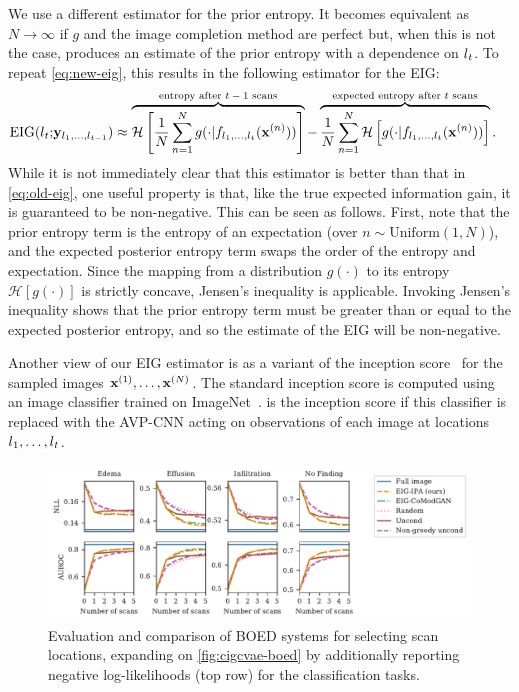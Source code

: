 We use a different estimator for the prior entropy. It becomes equivalent as $N
\rightarrow \infty$ if $g$ and the image completion method are perfect but, when
this is not the case, produces an estimate of the prior entropy with a
dependence on $l{}_t$. To repeat \cref{eq:new-eig}, this results in the following
estimator for the EIG:
\begin{align}
  \label{eq:new-eig-supp}
  \text{EIG}(l{}_t;& {\mathbf{y}}_{l{}_1,\ldots,l{}_{t-1}}) \approx \overbrace{\mathcal{H} \left[ \frac{1}{N} \sum_{n=1}^N g(\cdot|f_{l{}_1,\ldots,l{}_t}({\mathbf{x}}^{(n)})) \right]}^{\text{entropy after $t-1$ scans}} - \overbrace{\frac{1}{N} \sum_{n=1}^N  \mathcal{H} \left[ g(\cdot|f_{l{}_1,\ldots,l{}_t}({\mathbf{x}}^{(n)})) \right]}^{\text{expected entropy after $t$ scans}}.
\end{align}
While it is not immediately clear that this estimator is better than that in
\cref{eq:old-eig}, one useful property is that, like the true expected
information gain, it is guaranteed to be non-negative. This can be seen as
follows. First, note that the prior entropy term is the entropy of an
expectation (over $n \sim \text{Uniform}(1, N)$), and the expected posterior
entropy term swaps the order of the entropy and expectation. Since the mapping
from a distribution $g(\cdot)$ to its entropy $\mathcal{H}[g(\cdot)]$ is
strictly concave, Jensen's inequality is applicable. Invoking Jensen's
inequality shows that the prior entropy term must be greater than or equal to
the expected posterior entropy, and so the estimate of the EIG will be
non-negative. 

Another view of our EIG estimator is as a variant of the inception
score~\citep{salimans2016improved} for the sampled images
${\mathbf{x}}^{(1)},\ldots,{\mathbf{x}}^{(N)}$. The standard inception score is computed using
an image classifier trained on ImageNet~\citep{salimans2016improved}.
 is the inception score if this classifier is replaced with the
AVP-CNN acting on observations of each image at locations $l{}_1,\ldots,l{}_t$.

\begin{figure}[t]
  \centering
  \includegraphics[width=\textwidth]{figs/cigcvae/boed-auroc-curve-supp}
  \caption{Evaluation and comparison of BOED systems for selecting scan locations, expanding on \cref{fig:cigcvae-boed} by additionally reporting negative
    log-likelihoods (top row) for the classification tasks. }
  \label{fig:cigcvae-boed-auroc-supp}
\end{figure}

